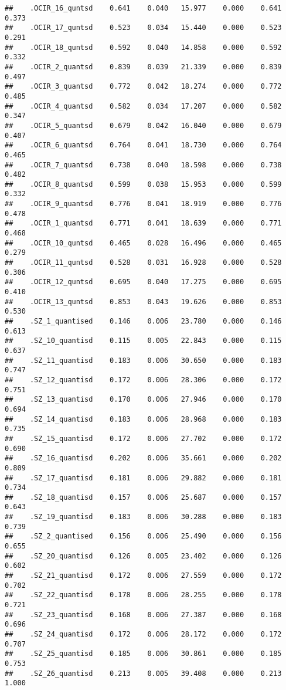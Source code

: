 \documentclass[]{article}
\begin{document}
\begin{verbatim}
##    .OCIR_16_quntsd    0.641    0.040   15.977    0.000    0.641    0.373
##    .OCIR_17_quntsd    0.523    0.034   15.440    0.000    0.523    0.291
##    .OCIR_18_quntsd    0.592    0.040   14.858    0.000    0.592    0.332
##    .OCIR_2_quantsd    0.839    0.039   21.339    0.000    0.839    0.497
##    .OCIR_3_quantsd    0.772    0.042   18.274    0.000    0.772    0.485
##    .OCIR_4_quantsd    0.582    0.034   17.207    0.000    0.582    0.347
##    .OCIR_5_quantsd    0.679    0.042   16.040    0.000    0.679    0.407
##    .OCIR_6_quantsd    0.764    0.041   18.730    0.000    0.764    0.465
##    .OCIR_7_quantsd    0.738    0.040   18.598    0.000    0.738    0.482
##    .OCIR_8_quantsd    0.599    0.038   15.953    0.000    0.599    0.332
##    .OCIR_9_quantsd    0.776    0.041   18.919    0.000    0.776    0.478
##    .OCIR_1_quantsd    0.771    0.041   18.639    0.000    0.771    0.468
##    .OCIR_10_quntsd    0.465    0.028   16.496    0.000    0.465    0.279
##    .OCIR_11_quntsd    0.528    0.031   16.928    0.000    0.528    0.306
##    .OCIR_12_quntsd    0.695    0.040   17.275    0.000    0.695    0.410
##    .OCIR_13_quntsd    0.853    0.043   19.626    0.000    0.853    0.530
##    .SZ_1_quantised    0.146    0.006   23.780    0.000    0.146    0.613
##    .SZ_10_quantisd    0.115    0.005   22.843    0.000    0.115    0.637
##    .SZ_11_quantisd    0.183    0.006   30.650    0.000    0.183    0.747
##    .SZ_12_quantisd    0.172    0.006   28.306    0.000    0.172    0.751
##    .SZ_13_quantisd    0.170    0.006   27.946    0.000    0.170    0.694
##    .SZ_14_quantisd    0.183    0.006   28.968    0.000    0.183    0.735
##    .SZ_15_quantisd    0.172    0.006   27.702    0.000    0.172    0.690
##    .SZ_16_quantisd    0.202    0.006   35.661    0.000    0.202    0.809
##    .SZ_17_quantisd    0.181    0.006   29.882    0.000    0.181    0.734
##    .SZ_18_quantisd    0.157    0.006   25.687    0.000    0.157    0.643
##    .SZ_19_quantisd    0.183    0.006   30.288    0.000    0.183    0.739
##    .SZ_2_quantised    0.156    0.006   25.490    0.000    0.156    0.655
##    .SZ_20_quantisd    0.126    0.005   23.402    0.000    0.126    0.602
##    .SZ_21_quantisd    0.172    0.006   27.559    0.000    0.172    0.702
##    .SZ_22_quantisd    0.178    0.006   28.255    0.000    0.178    0.721
##    .SZ_23_quantisd    0.168    0.006   27.387    0.000    0.168    0.696
##    .SZ_24_quantisd    0.172    0.006   28.172    0.000    0.172    0.707
##    .SZ_25_quantisd    0.185    0.006   30.861    0.000    0.185    0.753
##    .SZ_26_quantisd    0.213    0.005   39.408    0.000    0.213    1.000

\end{verbatim}
\end{document}
